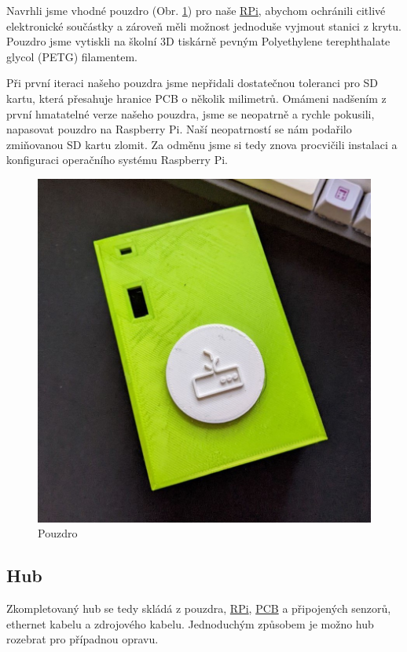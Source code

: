 \documentclass[czech,12pt,a4paper]{article}
\begin{document}
Navrhli jsme vhodné pouzdro (Obr. \ref{fig:pouzdro}) pro naše \underline{\ac{RPi}}, abychom ochránili citlivé elektronické součástky a zároveň měli možnost jednoduše vyjmout stanici z krytu. Pouzdro jsme vytiskli na školní 3D tiskárně pevným Polyethylene terephthalate glycol (PETG) filamentem.

Při první iteraci našeho pouzdra jsme nepřidali dostatečnou toleranci pro SD kartu, která přesahuje hranice PCB o několik milimetrů. Omámeni nadšením z první hmatatelné verze našeho pouzdra, jsme se neopatrně a rychle pokusili, napasovat pouzdro na Raspberry Pi. Naší neopatrností se nám podařilo zmiňovanou SD kartu zlomit. Za odměnu jsme si tedy znova procvičili instalaci a konfiguraci operačního systému Raspberry Pi.

\vspace*{1cm}
\begin{figure}[h]
	\centering
	\includegraphics[width=0.67\linewidth]{pouzdro.jpeg}
	\caption{Pouzdro}
	\label{fig:pouzdro}
\end{figure}

\subsection{Hub}

Zkompletovaný hub se tedy skládá z pouzdra, \underline{\ac{RPi}}, \underline{\ac{PCB}} a připojených senzorů, ethernet kabelu a zdrojového kabelu. Jednoduchým způsobem je možno hub rozebrat pro případnou opravu.
\end{document}
